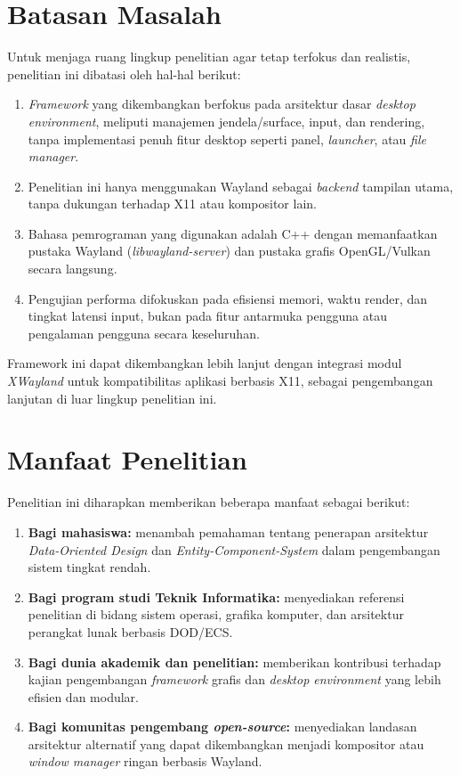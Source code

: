 \section{Batasan Masalah} \label{I.Batasan}
Untuk menjaga ruang lingkup penelitian agar tetap terfokus dan realistis, penelitian ini dibatasi oleh hal-hal berikut: \par
\begin{enumerate}[noitemsep]
    \item \textit{Framework} yang dikembangkan berfokus pada arsitektur dasar \textit{desktop environment}, meliputi manajemen jendela/surface, input, dan rendering, tanpa implementasi penuh fitur desktop seperti panel, \textit{launcher}, atau \textit{file manager}. 
    \item Penelitian ini hanya menggunakan Wayland sebagai \textit{backend} tampilan utama, tanpa dukungan terhadap X11 atau kompositor lain. 
    \item Bahasa pemrograman yang digunakan adalah C++ dengan memanfaatkan pustaka Wayland (\textit{libwayland-server}) dan pustaka grafis OpenGL/Vulkan secara langsung. 
    \item Pengujian performa difokuskan pada efisiensi memori, waktu render, dan tingkat latensi input, bukan pada fitur antarmuka pengguna atau pengalaman pengguna secara keseluruhan. 
\end{enumerate}
\par
Framework ini dapat dikembangkan lebih lanjut dengan integrasi modul \textit{XWayland} untuk kompatibilitas aplikasi berbasis X11, sebagai pengembangan lanjutan di luar lingkup penelitian ini. \par

\section{Manfaat Penelitian} \label{I.Manfaat}
Penelitian ini diharapkan memberikan beberapa manfaat sebagai berikut: \par
\begin{enumerate}[noitemsep]
    \item \textbf{Bagi mahasiswa:} menambah pemahaman tentang penerapan arsitektur \textit{Data-Oriented Design} dan \textit{Entity-Component-System} dalam pengembangan sistem tingkat rendah. 
    \item \textbf{Bagi program studi Teknik Informatika:} menyediakan referensi penelitian di bidang sistem operasi, grafika komputer, dan arsitektur perangkat lunak berbasis DOD/ECS. 
    \item \textbf{Bagi dunia akademik dan penelitian:} memberikan kontribusi terhadap kajian pengembangan \textit{framework} grafis dan \textit{desktop environment} yang lebih efisien dan modular. 
    \item \textbf{Bagi komunitas pengembang \textit{open-source}:} menyediakan landasan arsitektur alternatif yang dapat dikembangkan menjadi kompositor atau \textit{window manager} ringan berbasis Wayland. 
\end{enumerate}
\par


